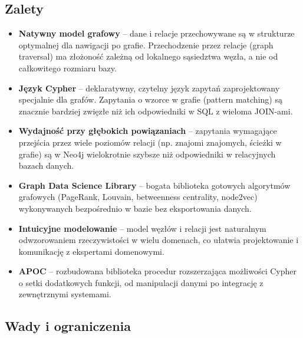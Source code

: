\subsection{Zalety}

\begin{itemize}
    \item \textbf{Natywny model grafowy} -- dane i relacje przechowywane
    są w strukturze optymalnej dla nawigacji po grafie. Przechodzenie
    przez relacje (graph traversal) ma złożoność zależną od lokalnego
    sąsiedztwa węzła, a nie od całkowitego rozmiaru bazy.
    \item \textbf{Język Cypher} -- deklaratywny, czytelny język zapytań
    zaprojektowany specjalnie dla grafów. Zapytania o wzorce w grafie
    (pattern matching) są znacznie bardziej zwięzłe niż ich odpowiedniki
    w SQL z wieloma JOIN-ami.
    \item \textbf{Wydajność przy głębokich powiązaniach} -- zapytania
    wymagające przejścia przez wiele poziomów relacji (np. znajomi znajomych,
    ścieżki w grafie) są w Neo4j wielokrotnie szybsze niż odpowiedniki
    w relacyjnych bazach danych.
    \item \textbf{Graph Data Science Library} -- bogata biblioteka
    gotowych algorytmów grafowych (PageRank, Louvain, betweenness centrality,
    node2vec) wykonywanych bezpośrednio w bazie bez eksportowania danych.
    \item \textbf{Intuicyjne modelowanie} -- model węzłów i relacji
    jest naturalnym odwzorowaniem rzeczywistości w wielu domenach,
    co ułatwia projektowanie i komunikację z ekspertami domenowymi.
    \item \textbf{APOC} -- rozbudowana biblioteka procedur rozszerzająca
    możliwości Cypher o setki dodatkowych funkcji, od manipulacji danymi
    po integrację z zewnętrznymi systemami.
\end{itemize}

\subsection{Wady i ograniczenia}

